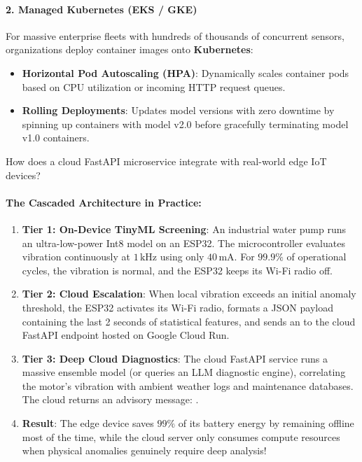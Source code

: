 \paragraph{2. Managed Kubernetes (EKS / GKE)}
For massive enterprise fleets with hundreds of thousands of concurrent sensors, organizations deploy container images onto \textbf{Kubernetes}:
\begin{itemize}
    \item \textbf{Horizontal Pod Autoscaling (HPA)}: Dynamically scales container pods based on CPU utilization or incoming HTTP request queues.
    \item \textbf{Rolling Deployments}: Updates model versions with zero downtime by spinning up containers with model v2.0 before gracefully terminating model v1.0 containers.
\end{itemize}

\begin{iotbox}
How does a cloud FastAPI microservice integrate with real-world edge IoT devices?

\paragraph{The Cascaded Architecture in Practice:}
\begin{enumerate}
    \item \textbf{Tier 1: On-Device TinyML Screening}: An industrial water pump runs an ultra-low-power Int8 model on an ESP32. The microcontroller evaluates vibration continuously at $1\,\text{kHz}$ using only $40\,\text{mA}$. For $99.9\%$ of operational cycles, the vibration is normal, and the ESP32 keeps its Wi-Fi radio off.
    \item \textbf{Tier 2: Cloud Escalation}: When local vibration exceeds an initial anomaly threshold, the ESP32 activates its Wi-Fi radio, formats a JSON payload containing the last 2 seconds of statistical features, and sends an  to the cloud FastAPI endpoint hosted on Google Cloud Run.
    \item \textbf{Tier 3: Deep Cloud Diagnostics}: The cloud FastAPI service runs a massive ensemble model (or queries an LLM diagnostic engine), correlating the motor's vibration with ambient weather logs and maintenance databases. The cloud returns an advisory message: .
    \item \textbf{Result}: The edge device saves $99\%$ of its battery energy by remaining offline most of the time, while the cloud server only consumes compute resources when physical anomalies genuinely require deep analysis!
\end{enumerate}
\end{iotbox}

